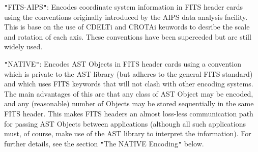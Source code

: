 \documentclass[twoside,11pt]{article}
\begin{document}
{{{         \sstitem
         {\tt{"}}FITS-AIPS{\tt{"}}: Encodes coordinate system information in FITS
         header cards using the conventions originally introduced by the
         AIPS data analysis facility. This is base on the use of CDELTi and
         CROTAi keuwords to desribe the scale and rotation of each axis.
         These conventions have been superceded but are still widely used.

         \sstitem
         {\tt{"}}NATIVE{\tt{"}}: Encodes AST Objects in FITS header cards using a
         convention which is private to the AST library (but adheres to
         the general FITS standard) and which uses FITS keywords that
         will not clash with other encoding systems. The main advantages
         of this are that any class of AST Object may be encoded, and any
         (reasonable) number of Objects may be stored sequentially in the
         same FITS header. This makes FITS headers an almost loss-less
         communication path for passing AST Objects between applications
         (although all such applications must, of course, make use of the
         AST library to interpret the information). For further details,
         see the section {\tt{"}}The NATIVE Encoding{\tt{"}} below.
      }
   }
   }
\end{document}
